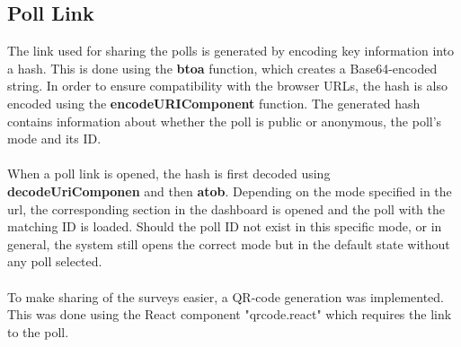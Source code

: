 \documentclass[a4paper,12pt]{report}
\begin{document}
\subsection{Poll Link}
The link used for sharing the polls is generated by encoding key information into a hash. This is done using the \textbf{btoa} function, which creates a Base64-encoded string. In order to ensure compatibility with the browser URLs, the hash is also encoded using the \textbf{encodeURIComponent} function. The generated hash contains information about whether the poll is public or anonymous, the poll's mode and its ID. \parencite{mdn-btoa} \parencite{mdn-encodeUriComponent}\\\\
When a poll link is opened, the hash is first decoded using \textbf{decodeUriComponen} and then \textbf{atob}. Depending on the mode specified in the url, the corresponding section in the dashboard is opened and the poll with the matching ID is loaded. Should the poll ID not exist in this specific mode, or in general, the system still opens the correct mode but in the default state without any poll selected. \parencite{mdn-atob} \parencite{mdn-decodeUriComponent}\\\\
To make sharing of the surveys easier, a QR-code generation was implemented. This was done using the React component "qrcode.react" which requires the link to the poll. \parencite{qrcode} \\
\end{document}
